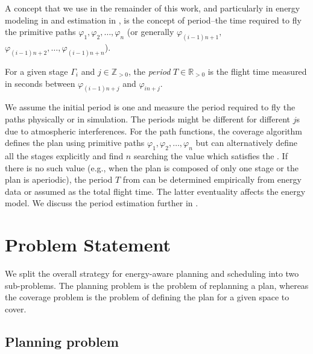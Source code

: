 A concept that we use in the remainder of this work, and particularly in energy modeling in  and estimation in , is the concept of period--the time required to fly the primitive paths $\varphi_1,\varphi_2,\dots,\varphi_n$ (or generally $\varphi_{(i-1)n+1},$ $\varphi_{(i-1)n+2},\dots,\varphi_{(i-1)n+n}$). 

\begin{highlight}
  \begin{defn}[Period]\label{def:period}
    For a given stage $\Gamma_i$ and $j\in\mathbb{Z}_{>0}$, the \emph{period} $T\in\mathbb{R}_{> 0}$ is the flight time measured in seconds between $\varphi_{(i-1)n+j}$ and $\varphi_{in+j}$.
  \end{defn} 
\end{highlight}
  
We assume the initial period is one and measure the period required to fly the paths physically or in simulation. The periods might be different for different $j$s due to atmospheric interferences. For the path functions, the coverage algorithm defines the plan using primitive paths $\varphi_1,\varphi_2,\dots,\varphi_n$ but can alternatively define all the stages explicitly and find $n$ searching the value which satisfies the . If there is no such value (e.g., when the plan is composed of only one stage or the plan is aperiodic), the period $T$ from  can be determined empirically from energy data or assumed as the total flight time. The latter eventuality affects the energy model. We discuss the period estimation further in .



\section{Problem Statement}

We split the overall strategy for energy-aware planning and scheduling into two sub-problems. The planning problem is the problem of replanning a plan, whereas the coverage problem is the problem of defining the plan for a given space to cover.  

\subsection{Planning problem}
\label{sec:plan-pb}

